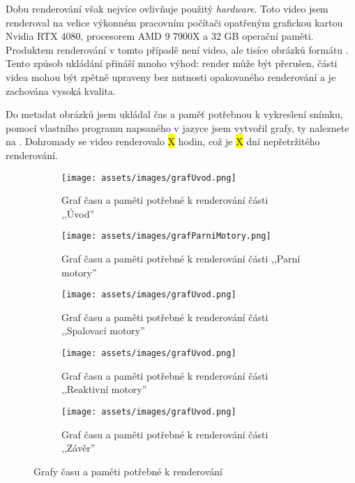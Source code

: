 {Dobu renderování však nejvíce ovlivňuje použitý \textit{hardware}. Toto video jsem renderoval na velice výkonném pracovním počítači opatřeným grafickou kartou Nvidia RTX 4080, procesorem AMD 9 7900X a 32 GB operační paměti.}\odst
{Produktem renderování v tomto případě není video, ale tisíce obrázků formátu . Tento způsob ukládání přináší mnoho výhod: render může být přerušen, části videa mohou být zpětně upraveny bez nutnosti opakovaného renderování a je zachována vysoká kvalita.}

\newpage

{Do metadat obrázků jsem ukládal čas a paměť potřebnou k vykreslení snímku, pomocí vlastního programu napsaného v jazyce  jsem vytvořil grafy, ty naleznete na . Dohromady se video renderovalo \hl{X} hodin, což je \hl{X} dní nepřetržitého renderování.}

\begin{figure}[H]
    \centering
    \begin{subfigure}{\textwidth}
        \centering
        \texttt{[image: assets/images/grafUvod.png]}
        \caption{Graf času a paměti potřebné k renderování části ,,Úvod'' \jaGraf}\vspace{0.25cm}
    \end{subfigure}
    \begin{subfigure}{\textwidth}
        \texttt{[image: assets/images/grafParniMotory.png]}
        \caption{Graf času a paměti potřebné k renderování části ,,Parní motory'' \jaGraf}\vspace{0.25cm}
    \end{subfigure}
    \begin{subfigure}{\textwidth}
        \texttt{[image: assets/images/grafUvod.png]}
        \caption{Graf času a paměti potřebné k renderování části ,,Spalovací motory'' \jaGraf}\vspace{0.25cm}
    \end{subfigure}
    \begin{subfigure}{\textwidth}
        \texttt{[image: assets/images/grafUvod.png]}
        \caption{Graf času a paměti potřebné k renderování části ,,Reaktivní motory'' \jaGraf}\vspace{0.25cm}
    \end{subfigure}
    \begin{subfigure}{\textwidth}
        \texttt{[image: assets/images/grafUvod.png]}
        \caption{Graf času a paměti potřebné k renderování části ,,Závěr'' \jaGraf}
    \end{subfigure}
    \caption{Grafy času a paměti potřebné k renderování}
    \label{obr:grafRender}
\end{figure}

